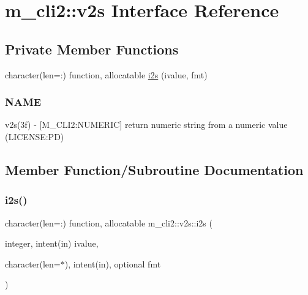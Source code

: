 \hypertarget{interfacem__cli2_1_1v2s}{}\section{m\+\_\+cli2\+:\+:v2s Interface Reference}
\label{interfacem__cli2_1_1v2s}
\subsection*{Private Member Functions}
\begin{DoxyCompactItemize}
\item 
character(len=\+:) function, allocatable \mbox{\hyperlink{interfacem__cli2_1_1v2s_a15467a4cf2f813fa65c4bbb460e04c69}{i2s}} (ivalue, fmt)
\begin{DoxyCompactList}\small\item\em \subsubsection*{N\+A\+ME}

v2s(3f) -\/ \mbox{[}M\+\_\+\+C\+L\+I2\+:N\+U\+M\+E\+R\+IC\mbox{]} return numeric string from a numeric value (L\+I\+C\+E\+N\+SE\+:PD) \end{DoxyCompactList}\end{DoxyCompactItemize}


\subsection{Member Function/\+Subroutine Documentation}
\mbox{\label{interfacem__cli2_1_1v2s_a15467a4cf2f813fa65c4bbb460e04c69}} 
\subsubsection{\texorpdfstring{i2s()}{i2s()}}
{\footnotesize\ttfamily character(len=\+:) function, allocatable m\+\_\+cli2\+::v2s\+::i2s (\begin{DoxyParamCaption}\item[{integer, intent(in)}]{ivalue,  }\item[{character(len=$\ast$), intent(in), optional}]{fmt }\end{DoxyParamCaption})\hspace{0.3cm}{\ttfamily [private]}}



